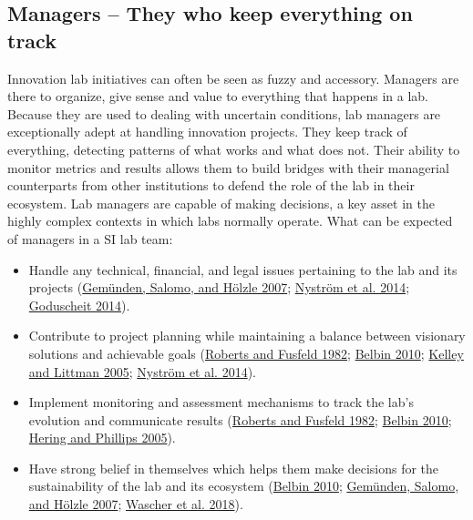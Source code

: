 \documentclass[AMA,STIX1COL,APA,STIX2COL]{WileyNJD-v2}
\providecommand{\tightlist}{%
  \setlength{\itemsep}{0pt}\setlength{\parskip}{0pt}}
\begin{document}
\hypertarget{managers-they-who-keep-everything-on-track}{%
\subsection{Managers -- They who keep everything on
track}\label{managers-they-who-keep-everything-on-track}}

Innovation lab initiatives can often be seen as fuzzy and accessory.
Managers are there to organize, give sense and value to everything that
happens in a lab. Because they are used to dealing with uncertain
conditions, lab managers are exceptionally adept at handling innovation
projects. They keep track of everything, detecting patterns of what
works and what does not. Their ability to monitor metrics and results
allows them to build bridges with their managerial counterparts from
other institutions to defend the role of the lab in their ecosystem. Lab
managers are capable of making decisions, a key asset in the highly
complex contexts in which labs normally operate. What can be expected of
managers in a SI lab team:

\begin{itemize}
\tightlist
\item
  Handle any technical, financial, and legal issues pertaining to the
  lab and its projects (\protect\hyperlink{ref-Gemunden2007}{Gemünden,
  Salomo, and Hölzle 2007}; \protect\hyperlink{ref-Nystrom2014}{Nyström
  et al. 2014}; \protect\hyperlink{ref-Goduscheit2014}{Goduscheit
  2014}).
\item
  Contribute to project planning while maintaining a balance between
  visionary solutions and achievable goals
  (\protect\hyperlink{ref-Roberts1982}{Roberts and Fusfeld 1982};
  \protect\hyperlink{ref-Belbin2010}{Belbin 2010};
  \protect\hyperlink{ref-Kelley2005}{Kelley and Littman 2005};
  \protect\hyperlink{ref-Nystrom2014}{Nyström et al. 2014}).
\item
  Implement monitoring and assessment mechanisms to track the lab's
  evolution and communicate results
  (\protect\hyperlink{ref-Roberts1982}{Roberts and Fusfeld 1982};
  \protect\hyperlink{ref-Belbin2010}{Belbin 2010};
  \protect\hyperlink{ref-Hering2005}{Hering and Phillips 2005}).
\item
  Have strong belief in themselves which helps them make decisions for
  the sustainability of the lab and its ecosystem
  (\protect\hyperlink{ref-Belbin2010}{Belbin 2010};
  \protect\hyperlink{ref-Gemunden2007}{Gemünden, Salomo, and Hölzle
  2007}; \protect\hyperlink{ref-Wascher2018}{Wascher et al. 2018}).
\end{itemize}
\end{document}
